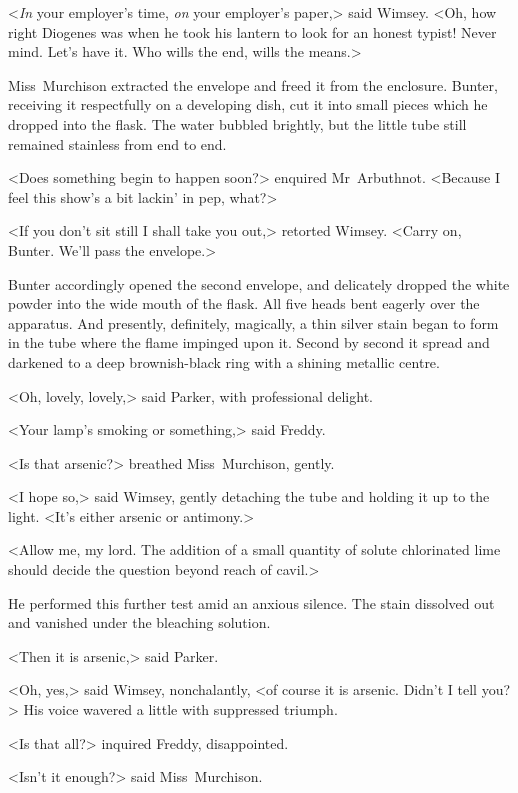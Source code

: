 <\emph{In} your employer's time, \emph{on} your employer's paper,> said Wimsey. <Oh, how right Diogenes was when he took his lantern to look for an honest typist! Never mind. Let's have it. Who wills the end, wills the means.>

Miss~Murchison extracted the envelope and freed it from the enclosure. Bunter, receiving it respectfully on a developing dish, cut it into small pieces which he dropped into the flask. The water bubbled brightly, but the little tube still remained stainless from end to end.

<Does something begin to happen soon?> enquired Mr~Arbuthnot. <Because I feel this show's a bit lackin' in pep, what?>

<If you don't sit still I shall take you out,> retorted Wimsey. <Carry on, Bunter. We'll pass the envelope.>

Bunter accordingly opened the second envelope, and delicately dropped the white powder into the wide mouth of the flask. All five heads bent eagerly over the apparatus. And presently, definitely, magically, a thin silver stain began to form in the tube where the flame impinged upon it. Second by second it spread and darkened to a deep brownish-black ring with a shining metallic centre.

<Oh, lovely, lovely,> said Parker, with professional delight.

<Your lamp's smoking or something,> said Freddy.

<Is that arsenic?> breathed Miss~Murchison, gently.

<I hope so,> said Wimsey, gently detaching the tube and holding it up to the light. <It's either arsenic or antimony.>

<Allow me, my lord. The addition of a small quantity of solute chlorinated lime should decide the question beyond reach of cavil.>

He performed this further test amid an anxious silence. The stain dissolved out and vanished under the bleaching solution.

<Then it is arsenic,> said Parker.

<Oh, yes,> said Wimsey, nonchalantly, <of course it is arsenic. Didn't I tell you?> His voice wavered a little with suppressed triumph.

<Is that all?> inquired Freddy, disappointed.

<Isn't it enough?> said Miss~Murchison.

